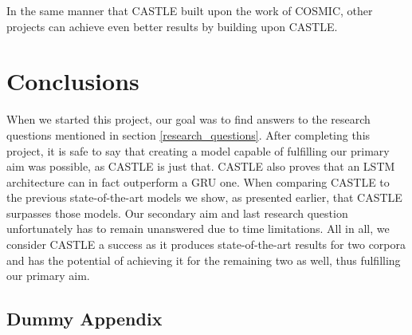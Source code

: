 \documentclass[nofilelist]{cslthse-msc}
\begin{document}
In the same manner that CASTLE built upon the work of COSMIC, other projects can achieve even better results by building upon CASTLE. 









\chapter{Conclusions}
When we started this project, our goal was to find answers to the research questions mentioned in section \ref{research_questions}. After completing this project, it is safe to say that creating a model capable of fulfilling our primary aim was possible, as CASTLE is just that. CASTLE also proves that an LSTM architecture can in fact outperform a GRU one. When comparing CASTLE to the previous state-of-the-art models we show, as presented earlier, that CASTLE surpasses those models. Our secondary aim and last research question unfortunately has to remain unanswered due to time limitations. All in all, we consider CASTLE a success as it produces state-of-the-art results for two corpora and has the potential of achieving it for the remaining two as well, thus fulfilling our primary aim.  



{}

\begin{appendices}
\chapter{Dummy Appendix}






\printfilelist

\checkoddpage
\ifoddpage
\else
   \newpage
   \thispagestyle{empty}
   \mbox{ }
\fi

\end{appendices}
\end{document}
